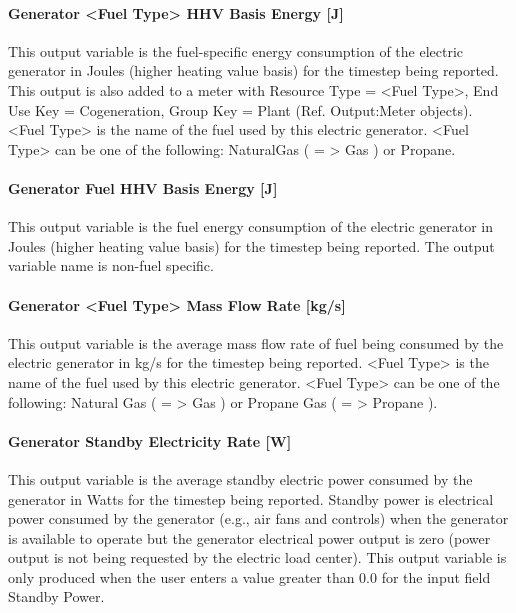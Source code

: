\paragraph{Generator \textless{}Fuel Type\textgreater{} HHV Basis Energy {[}J{]}}\label{generator-fuel-type-hhv-basis-energy-j}

This output variable is the fuel-specific energy consumption of the electric generator in Joules (higher heating value basis) for the timestep being reported. This output is also added to a meter with Resource Type = \textless{}Fuel Type\textgreater{}, End Use Key = Cogeneration, Group Key = Plant (Ref. Output:Meter objects). \textless{}Fuel Type\textgreater{} is the name of the fuel used by this electric generator. \textless{}Fuel Type\textgreater{} can be one of the following: NaturalGas ( = \textgreater{} Gas ) or Propane.

\paragraph{Generator Fuel HHV Basis Energy {[}J{]}}\label{generator-fuel-hhv-basis-energy-j-1}

This output variable is the fuel energy consumption of the electric generator in Joules (higher heating value basis) for the timestep being reported. The output variable name is non-fuel specific.

\paragraph{Generator \textless{}Fuel Type\textgreater{} Mass Flow Rate {[}kg/s{]}}\label{generator-fuel-type-mass-flow-rate-kgs-2}

This output variable is the average mass flow rate of fuel being consumed by the electric generator in kg/s for the timestep being reported. \textless{}Fuel Type\textgreater{} is the name of the fuel used by this electric generator. \textless{}Fuel Type\textgreater{} can be one of the following: Natural Gas ( = \textgreater{} Gas ) or Propane Gas ( = \textgreater{} Propane ).

\paragraph{Generator Standby Electricity Rate {[}W{]}}\label{generator-standby-electric-power-w}

This output variable is the average standby electric power consumed by the generator in Watts for the timestep being reported. Standby power is electrical power consumed by the generator (e.g., air fans and controls) when the generator is available to operate but the generator electrical power output is zero (power output is not being requested by the electric load center). This output variable is only produced when the user enters a value greater than 0.0 for the input field Standby Power.

